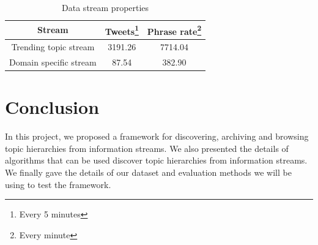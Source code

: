 \documentclass{sig-alternate}
\begin{document}
\begin{table}
 \begin{minipage}{5cm}
 \begin{center}
    \begin{tabular}{ c|c|c}
    \hline
    \textbf{Stream} & \textbf{Tweets\footnote{Every 5 minutes}} & \textbf{Phrase rate\footnote{Every minute}} \\ \hline\hline
    Trending topic stream & 3191.26  & 7714.04\\ \hline
    Domain specific stream & 87.54 & 382.90 \\ \hline
    \end{tabular}
    \end{center} 
      \end{minipage}
    \caption{Data stream properties}
  \label{table:data-stream}
 \end{table}
 
 \section{Conclusion}
 In this project, we proposed a framework for discovering, archiving and browsing topic hierarchies from information streams. We also presented the details of algorithms that can be used discover topic hierarchies from information streams. We finally gave the details of our dataset and evaluation methods we will be using to test the framework.
\end{document}
